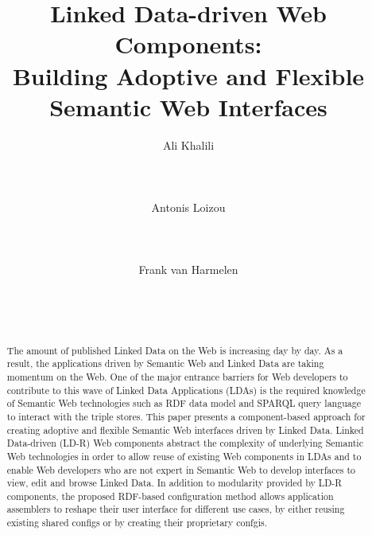\documentclass{acm_proc_article-sp}
\begin{document}
\title{Linked Data-driven Web Components:\\ Building Adoptive and Flexible Semantic Web Interfaces}
\subtitle{}

\author{
\alignauthor
Ali Khalili\\
       \\
       \\
       \\
\alignauthor
Antonis Loizou\\
       \\
       \\
       \\
\alignauthor
Frank van Harmelen\\
       \\
       \\
       \\
}


\maketitle
\begin{abstract}
The amount of published Linked Data on the Web is increasing day by day.
As a result, the applications driven by Semantic Web and Linked Data are taking momentum on the Web.
One of the major entrance barriers for Web developers to contribute to this wave of Linked Data Applications (LDAs) is the required knowledge of Semantic Web technologies such as RDF data model and SPARQL query language to interact with the triple stores.
This paper presents a component-based approach for creating adoptive and flexible Semantic Web interfaces driven by Linked Data.
Linked Data-driven (LD-R) Web components abstract the complexity of underlying Semantic Web technologies in order to allow reuse of existing Web components in LDAs and to enable Web developers who are not expert in Semantic Web to develop interfaces to view, edit and browse Linked Data.
In addition to modularity provided by LD-R components, the proposed RDF-based configuration method allows application assemblers to reshape their user interface for different use cases, by either reusing existing shared configs or by creating their proprietary confgis.

\end{abstract}
\end{document}
